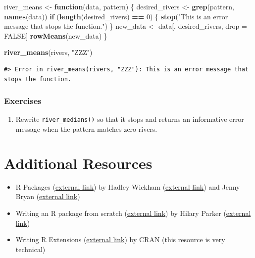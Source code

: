 \documentclass[
]{book}
\newenvironment{Shaded}{\begin{snugshade}}{\end{snugshade}}
\newcommand{\ControlFlowTok}[1]{\textcolor[rgb]{0.13,0.29,0.53}{\textbf{#1}}}
\newcommand{\DecValTok}[1]{\textcolor[rgb]{0.00,0.00,0.81}{#1}}
\newcommand{\KeywordTok}[1]{\textcolor[rgb]{0.13,0.29,0.53}{\textbf{#1}}}
\newcommand{\NormalTok}[1]{#1}
\newcommand{\OperatorTok}[1]{\textcolor[rgb]{0.81,0.36,0.00}{\textbf{#1}}}
\newcommand{\OtherTok}[1]{\textcolor[rgb]{0.56,0.35,0.01}{#1}}
\newcommand{\StringTok}[1]{\textcolor[rgb]{0.31,0.60,0.02}{#1}}
\providecommand{\tightlist}{%
  \setlength{\itemsep}{0pt}\setlength{\parskip}{0pt}}
\begin{document}
\begin{Shaded}
\begin{Highlighting}[]
\NormalTok{river_means <-}\StringTok{ }\ControlFlowTok{function}\NormalTok{(data, pattern) \{}
\NormalTok{  desired_rivers <-}\StringTok{ }\KeywordTok{grep}\NormalTok{(pattern, }\KeywordTok{names}\NormalTok{(data))}
  \ControlFlowTok{if}\NormalTok{ (}\KeywordTok{length}\NormalTok{(desired_rivers) }\OperatorTok{==}\StringTok{ }\DecValTok{0}\NormalTok{) \{}
    \KeywordTok{stop}\NormalTok{(}\StringTok{"This is an error message that stops the function."}\NormalTok{)}
\NormalTok{  \}}
\NormalTok{  new_data <-}\StringTok{ }\NormalTok{data[, desired_rivers, drop =}\StringTok{ }\OtherTok{FALSE}\NormalTok{]}
  \KeywordTok{rowMeans}\NormalTok{(new_data)}
\NormalTok{\}}
\end{Highlighting}
\end{Shaded}

\begin{Shaded}
\begin{Highlighting}[]
\KeywordTok{river_means}\NormalTok{(rivers, }\StringTok{"ZZZ"}\NormalTok{)}
\end{Highlighting}
\end{Shaded}

\begin{verbatim}
#> Error in river_means(rivers, "ZZZ"): This is an error message that stops the function.
\end{verbatim}

\hypertarget{ex-set6}{%
\subsubsection{Exercises}\label{ex-set6}}

\begin{enumerate}
\def\labelenumi{\arabic{enumi}.}
\tightlist
\item
  Rewrite \texttt{river\_medians()} so that it stops and returns an informative error message when the pattern matches zero rivers.
\end{enumerate}

\hypertarget{add-resources}{%
\section{Additional Resources}\label{add-resources}}

\begin{itemize}
\tightlist
\item
  R Packages (\href{https://r-pkgs.org/index.html}{external link}) by Hadley Wickham (\href{http://hadley.nz/}{external link}) and Jenny Bryan (\href{https://jennybryan.org/}{external link}) \citep{wickham2015r}
\item
  Writing an R package from scratch (\href{https://hilaryparker.com/2014/04/29/writing-an-r-package-from-scratch/}{external link}) by Hilary Parker (\href{https://hilaryparker.com/}{external link})
\item
  Writing R Extensions (\href{https://cran.r-project.org/doc/manuals/r-release/R-exts.html}{external link}) by CRAN (this resource is very technical)
\end{itemize}
\end{document}
